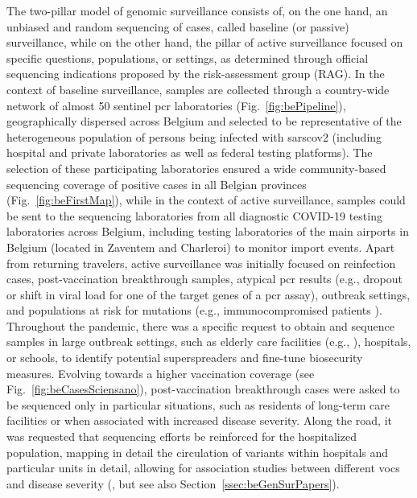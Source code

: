 The two-pillar model of genomic surveillance consists of, on the one hand, an unbiased and random sequencing of cases, called baseline (or passive) surveillance, while on the other hand, the pillar of active surveillance focused on specific questions, populations, or settings, as determined through official sequencing indications proposed by the risk-assessment group (RAG).
In the context of baseline surveillance, samples are collected through a country-wide network of almost 50 sentinel \gls{pcr} laboratories (Fig.~\ref{fig:bePipeline}), geographically dispersed across Belgium and selected to be representative of the heterogeneous population of persons being infected with \gls{sarscov2} (including hospital and private laboratories as well as federal testing platforms).
The selection of these participating laboratories ensured a wide community-based sequencing coverage of positive cases in all Belgian provinces (Fig.~\ref{fig:beFirstMap}), while in the context of active surveillance, samples could be sent to the sequencing laboratories from all diagnostic COVID-19 testing laboratories across Belgium, including testing laboratories of the main airports in Belgium (located in Zaventem and Charleroi) to monitor import events.
Apart from returning travelers, active surveillance was initially focused on reinfection cases, post-vaccination breakthrough samples, atypical \gls{pcr} results (e.g., dropout or shift in viral load for one of the target genes of a \gls{pcr} assay), outbreak settings, and populations at risk for mutations (e.g., immunocompromised patients \citep{vandermoeren2022viral}).
Throughout the pandemic, there was a specific request to obtain and sequence samples in large outbreak settings, such as elderly care facilities (e.g., \citep{vuylsteke2022role}), hospitals, or schools, to identify potential superspreaders and fine-tune biosecurity measures.
Evolving towards a higher vaccination coverage (see Fig.~\ref{fig:beCasesSciensano}), post-vaccination breakthrough cases were asked to be sequenced only in particular situations, such as residents of long-term care facilities or when associated with increased disease severity.
Along the road, it was requested that sequencing efforts be reinforced for the hospitalized population, mapping in detail the circulation of variants within hospitals and particular units in detail, allowing for association studies between different \gls{voc}s and disease severity (\citep{vangoethem2022severity,vangoethem2022clinical}, but see also Section~\ref{ssec:beGenSurPapers}).

